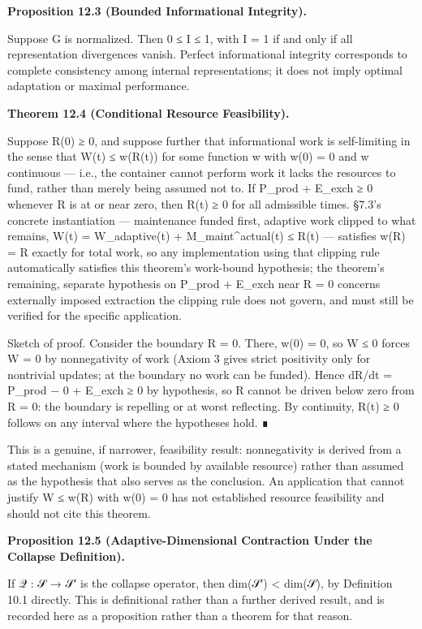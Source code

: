 \documentclass[
]{article}
\begin{document}
\textbf{Proposition 12.3 (Bounded Informational Integrity).}

Suppose G is normalized. Then 0 ≤ I ≤ 1, with I = 1 if and only if all
representation divergences vanish. Perfect informational integrity
corresponds to complete consistency among internal representations; it
does not imply optimal adaptation or maximal performance.

\textbf{Theorem 12.4 (Conditional Resource Feasibility).}

Suppose R(0) ≥ 0, and suppose further that informational work is
self-limiting in the sense that W(t) ≤ w(R(t)) for some function w with
w(0) = 0 and w continuous --- i.e., the container cannot perform work it
lacks the resources to fund, rather than merely being assumed not to. If
P\_prod + E\_exch ≥ 0 whenever R is at or near zero, then R(t) ≥ 0 for
all admissible times. §7.3's concrete instantiation --- maintenance
funded first, adaptive work clipped to what remains, W(t) =
W\_adaptive(t) + M\_maint\^{}actual(t) ≤ R(t) --- satisfies w(R) = R
exactly for total work, so any implementation using that clipping rule
automatically satisfies this theorem's work-bound hypothesis; the
theorem's remaining, separate hypothesis on P\_prod + E\_exch near R = 0
concerns externally imposed extraction the clipping rule does not
govern, and must still be verified for the specific application.

Sketch of proof. Consider the boundary R = 0. There, w(0) = 0, so W ≤ 0
forces W = 0 by nonnegativity of work (Axiom 3 gives strict positivity
only for nontrivial updates; at the boundary no work can be funded).
Hence dR/dt = P\_prod − 0 + E\_exch ≥ 0 by hypothesis, so R cannot be
driven below zero from R = 0: the boundary is repelling or at worst
reflecting. By continuity, R(t) ≥ 0 follows on any interval where the
hypotheses hold. ∎

This is a genuine, if narrower, feasibility result: nonnegativity is
derived from a stated mechanism (work is bounded by available resource)
rather than assumed as the hypothesis that also serves as the
conclusion. An application that cannot justify W ≤ w(R) with w(0) = 0
has not established resource feasibility and should not cite this
theorem.

\textbf{Proposition 12.5 (Adaptive-Dimensional Contraction Under the
Collapse Definition).}

If 𝒬 : 𝒮 → 𝒮′ is the collapse operator, then dim(𝒮′) \textless{} dim(𝒮),
by Definition 10.1 directly. This is definitional rather than a further
derived result, and is recorded here as a proposition rather than a
theorem for that reason.
\end{document}

